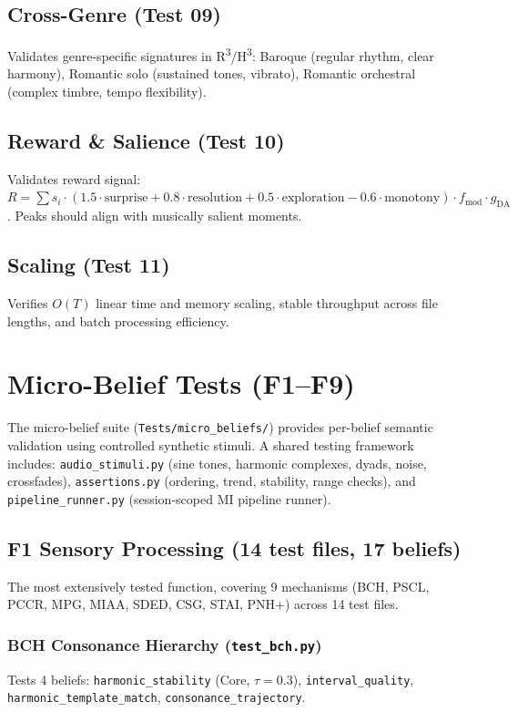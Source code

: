 \documentclass[10pt,twocolumn]{article}
\newcommand{\Rthree}{R\textsuperscript{3}}
\newcommand{\Hthree}{H\textsuperscript{3}}
\newcommand{\fn}[1]{\textbf{F#1}}
\newcommand{\belief}[1]{\texttt{#1}}
\begin{document}
\subsection{Cross-Genre (Test 09)}
Validates genre-specific signatures in \Rthree{}/\Hthree{}: Baroque (regular rhythm, clear harmony), Romantic solo (sustained tones, vibrato), Romantic orchestral (complex timbre, tempo flexibility).

\subsection{Reward \& Salience (Test 10)}
Validates reward signal: $R = \sum s_i \cdot (1.5 \cdot \text{surprise} + 0.8 \cdot \text{resolution} + 0.5 \cdot \text{exploration} - 0.6 \cdot \text{monotony}) \cdot f_{\text{mod}} \cdot g_{\text{DA}}$. Peaks should align with musically salient moments.

\subsection{Scaling (Test 11)}
Verifies $O(T)$ linear time and memory scaling, stable throughput across file lengths, and batch processing efficiency.

\section{Micro-Belief Tests (F1--F9)}
\label{sec:micro}

The micro-belief suite (\texttt{Tests/micro\_beliefs/}) provides per-belief semantic validation using controlled synthetic stimuli. A shared testing framework includes: \texttt{audio\_stimuli.py} (sine tones, harmonic complexes, dyads, noise, crossfades), \texttt{assertions.py} (ordering, trend, stability, range checks), and \texttt{pipeline\_runner.py} (session-scoped MI pipeline runner).

\subsection{\fn{1} Sensory Processing (14 test files, 17 beliefs)}

The most extensively tested function, covering 9 mechanisms (BCH, PSCL, PCCR, MPG, MIAA, SDED, CSG, STAI, PNH+) across 14 test files.

\subsubsection{BCH Consonance Hierarchy (\texttt{test\_bch.py})}
Tests 4 beliefs: \belief{harmonic\_stability} (Core, $\tau\!=\!0.3$), \belief{interval\_quality}, \belief{harmonic\_template\_match}, \belief{consonance\_trajectory}.
\end{document}
